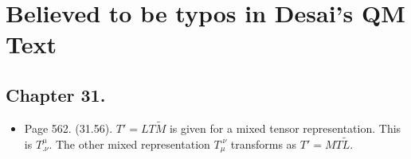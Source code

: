 

\label{chap:desaiTypos}
{}
\date{Oct 31, 2010}

\chapter{Believed to be typos in Desai's QM Text}

\beginArtNoToc



\section{Chapter 31.}
\begin{itemize}
\item Page 562.  (31.56).  $T' = L T \tilde{M}$ is given for a mixed tensor representation.  This is $T^\mu_{.\nu}$.  The other mixed representation $T_{\mu}^{.\nu}$ transforms as $T' = M T \tilde{L}$.
\end{itemize}

